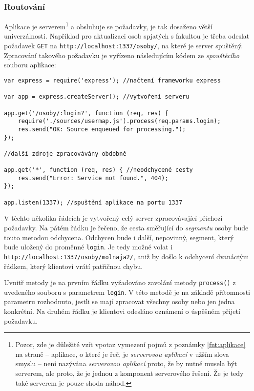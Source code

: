 \subsubsection{Routování}
Aplikace je serverem\footnote{Pozor, zde je důležité vzít vpotaz vymezení pojmů z poznámky \ref{fnt:aplikace} na straně \pageref{fnt:aplikace} -- aplikace, o které je řeč, je \textit{serverovou aplikací} v užším slova smyslu -- není nazývána \textit{serverovou aplikací} proto, že by nutně musela být serverem, ale proto, že je jednou z komponent serverového řešení. Že je tedy také serverem je pouze shoda náhod.} a obsluhuje se  požadavky, je tak dosaženo větší univerzálnosti. Například pro aktualizaci osob spjatých s fakultou je třeba odeslat požadavek \texttt{GET} na  \texttt{http://\linebreak[0]localhost:1337/\linebreak[0]osoby/}, na které je server spuštěný. Zpracování takového požadavku je vyřízeno následujícím kódem ze \textit{spouštěcího} souboru aplikace:
\begin{verbatim}
var express = require('express'); //načtení frameworku express

var app = express.createServer(); //vytvoření serveru

app.get('/osoby/:login?', function (req, res) {
    require('./sources/usermap.js').process(req.params.login);
    res.send("OK: Source enqueued for processing.");
});

//další zdroje zpracovávány obdobně

app.get('*', function (req, res) { //neodchycené cesty
    res.send("Error: Service not found.", 404);
});

app.listen(1337); //spuštění aplikace na portu 1337
\end{verbatim}
V těchto několika řádcích je vytvořený celý server zpracovávající příchozí požadavky. Na pátém řádku je řečeno, že cesta směřující do \textit{segmentu} osoby bude touto metodou odchycena. Odchycen bude i další, nepovinný, segment, který bude uložený do proměnné \texttt{login}. Je tedy možné volat i  \texttt{http://\linebreak[0]localhost:1337/\linebreak[0]osoby/\linebreak[0]molnaja2/}, aniž by došlo k odchycení dvanáctým řádkem, který klientovi vrátí patřičnou chybu.

Uvnitř metody je na prvním řádku vyžadováno zavolání metody \texttt{process()} z uvedeného souboru s parametrem \texttt{login}. V této metodě je na základě přítomnosti parametru rozhodnuto, jestli se mají zpracovat všechny osoby nebo jen jedna konkrétní. Na druhém řádku je klientovi odesláno oznámení o úspěšném přijetí požadavku.

